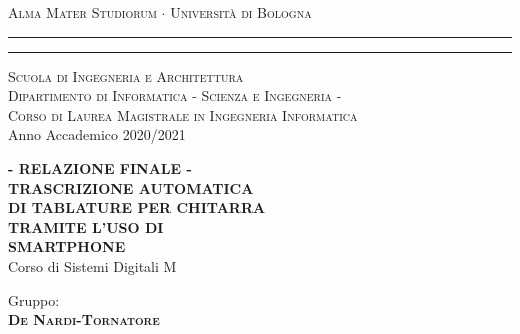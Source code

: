 \begin{titlepage}
\begin{center}
    {{\Large{\textsc{Alma Mater Studiorum $\cdot$ Universit\`a di
    Bologna}}}}
	\rule[0.1cm]{15.8cm}{0.1mm}
    \rule[0.5cm]{15.8cm}{0.6mm}
    {\normalsize{\textsc { Scuola di Ingegneria e Architettura\\
    \vspace{5mm}
    Dipartimento di Informatica - Scienza e Ingegneria -\\
    \vspace{5mm}
    Corso di Laurea Magistrale in Ingegneria Informatica}}}\\
	\vspace{10mm}
	{\small{\sc Anno Accademico 2020/2021}}%
\end{center}
\vspace{10mm}
\begin{center}
    {\LARGE\textbf{- RELAZIONE FINALE -}}\\
    \vspace{3mm}
    {\LARGE\textbf{TRASCRIZIONE AUTOMATICA}}\\
    \vspace{3mm}
    {\LARGE\textbf{ DI TABLATURE PER CHITARRA}}\\
    \vspace{3mm}
    {\LARGE{\bf TRAMITE L'USO DI}}\\
    \vspace{3mm}
    {\LARGE{\bf SMARTPHONE}}\\
    \vspace{10mm} {\large{\sc Corso di Sistemi Digitali M}}
\end{center}
\vfill
\par
\noindent
\begin{minipage}[t]{0.47\textwidth}
    {\large{\sc Gruppo:}\\
    {\bf \textsc{De Nardi-Tornatore}}}\\
\end{minipage}
\vspace{20mm}
\end{titlepage}
\restoregeometry
